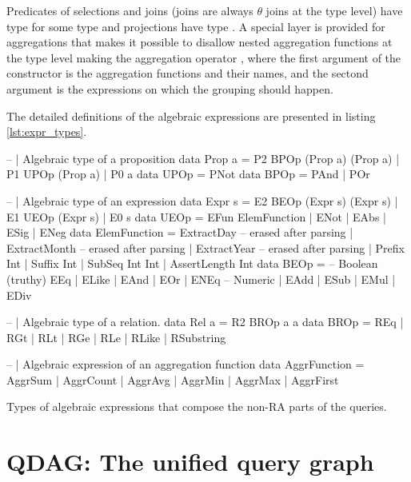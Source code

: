 Predicates of selections and joins (joins are always \(\theta\) joins
at the type level) have type  for some type
 and projections have type . A
special layer is provided for aggregations  that makes it
possible to disallow nested aggregation functions at the type level
making the aggregation operator , where the first argument of the constructor is the
aggregation functions and their names, and the sectond argument is the
expressions on which the grouping should happen.

The detailed definitions of the algebraic expressions are presented in
listing \ref{lst:expr_types}.

\begin{code}
  \begin{haskellcode}
    -- | Algebraic type of a proposition
    data Prop a = P2 BPOp (Prop a) (Prop a)
      | P1 UPOp (Prop a)
      | P0 a
    data UPOp = PNot
    data BPOp = PAnd | POr

    -- | Algebraic type of an expression
    data Expr s = E2 BEOp (Expr s) (Expr s)
      | E1 UEOp (Expr s)
      | E0 s
    data UEOp =
      EFun ElemFunction
      | ENot
      | EAbs
      | ESig
      | ENeg
    data ElemFunction
      = ExtractDay -- erased after parsing
      | ExtractMonth -- erased after parsing
      | ExtractYear -- erased after parsing
      | Prefix Int
      | Suffix Int
      | SubSeq Int Int
      | AssertLength Int
    data BEOp =
      -- Boolean (truthy)
      EEq | ELike | EAnd | EOr | ENEq
      -- Numeric
      | EAdd | ESub | EMul | EDiv

    -- | Algebraic type of a relation.
    data Rel a = R2 BROp a a
    data BROp
      = REq
      | RGt
      | RLt
      | RGe
      | RLe
      | RLike
      | RSubstring

    -- | Algebraic expression of an aggregation function
    data AggrFunction = AggrSum
      | AggrCount
      | AggrAvg
      | AggrMin
      | AggrMax
      | AggrFirst
  \end{haskellcode}
  \caption{\label{lst:expr_types} Types of algebraic expressions that compose the non-RA parts of the queries.}
\end{code}

\section{QDAG: The unified query graph}
\label{sec:qdag}

